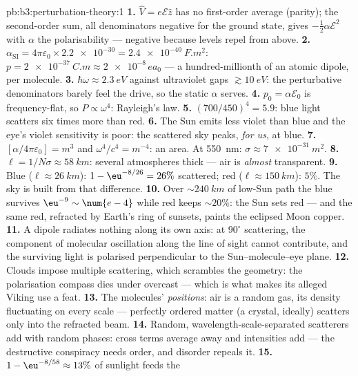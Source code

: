 \begin{solution}{pb:b3:perturbation-theory:1}
\textbf{1.} $\hat V = e\mathcal E\hat z$ has no first-order average
(parity); the second-order sum, all denominators negative for the
ground state, gives $-\tfrac12\alpha\mathcal E^2$ with $\alpha$ the
polarisability --- negative because levels repel from above.
\textbf{2.} $\alpha_{\text{SI}} = 4\pi\varepsilon_0 \times
\num{2.2e-30} = \qty{2.4e-40}{F.m^2}$: $p = \qty{2e-37}{C.m}
\approx \num{2e-8}\,ea_0$ --- a hundred-millionth of an atomic
dipole, per molecule.
\textbf{3.} $\hbar\omega \approx \qty{2.3}{eV}$ against
ultraviolet gaps $\gtrsim\qty{10}{eV}$: the perturbative
denominators barely feel the drive, so the static $\alpha$
serves.
\textbf{4.} $p_0 = \alpha\mathcal E_0$ is frequency-flat, so $P
\propto \omega^4$: Rayleigh's law.
\textbf{5.} $(700/450)^4 = 5.9$: blue light scatters six times
more than red.
\textbf{6.} The Sun emits less violet than blue and the eye's
violet sensitivity is poor: the scattered sky peaks, \emph{for
us}, at blue.
\textbf{7.} $[\alpha/4\pi\varepsilon_0] = \unit{m^3}$ and
$\omega^4/c^4 = \unit{m^{-4}}$: an area. At \qty{550}{nm}:
$\sigma \approx \qty{7e-31}{m^2}$.
\textbf{8.} $\ell = 1/N\sigma \approx \qty{58}{km}$: several
atmospheres thick --- air is \emph{almost} transparent.
\textbf{9.} Blue ($\ell \approx \qty{26}{km}$): $1 -
\eu^{-8/26} = 26\%$ scattered; red ($\ell \approx \qty{150}{km}$):
$5\%$. The sky is built from that difference.
\textbf{10.} Over $\sim\qty{240}{km}$ of low-Sun path the blue
survives $\eu^{-9} \sim \num{e-4}$ while red keeps $\sim20\%$: the
Sun sets red --- and the same red, refracted by Earth's ring of
sunsets, paints the eclipsed Moon copper.
\textbf{11.} A dipole radiates nothing along its own axis: at
$90^\circ$ scattering, the component of molecular oscillation
along the line of sight cannot contribute, and the surviving
light is polarised perpendicular to the Sun--molecule--eye plane.
\textbf{12.} Clouds impose multiple scattering, which scrambles
the geometry: the polarisation compass dies under overcast ---
which is what makes its alleged Viking use a feat.
\textbf{13.} The molecules' \emph{positions}: air is a random
gas, its density fluctuating on every scale --- perfectly ordered
matter (a crystal, ideally) scatters only into the refracted
beam.
\textbf{14.} Random, wavelength-scale-separated scatterers add
with random phases: cross terms average away and intensities add
--- the destructive conspiracy needs order, and disorder repeals
it.
\textbf{15.} $1 - \eu^{-8/58} \approx 13\%$ of sunlight feeds the

\end{solution}
